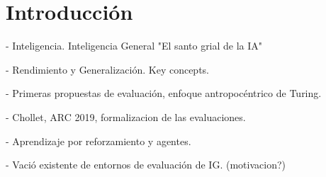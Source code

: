 \chapter*{Introducción}\label{chapter:introduction}

- Inteligencia. Inteligencia General "El santo grial de la IA"

- Rendimiento y Generalización. Key concepts.

- Primeras propuestas de evaluación, enfoque antropocéntrico de Turing.

- Chollet, ARC 2019, formalizacion de las evaluaciones.

- Aprendizaje por reforzamiento y agentes.

- Vació existente de entornos de evaluación de IG. (motivacion?)